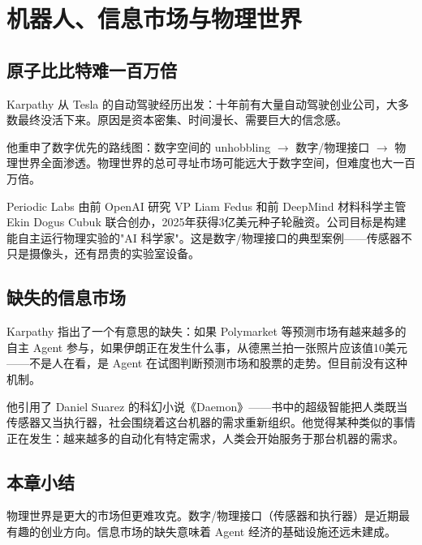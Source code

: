 \section{机器人、信息市场与物理世界}

\subsection{原子比比特难一百万倍}

Karpathy 从 Tesla 的自动驾驶经历出发：十年前有大量自动驾驶创业公司，大多数最终没活下来。原因是资本密集、时间漫长、需要巨大的信念感。

他重申了数字优先的路线图：数字空间的 unhobbling $\rightarrow$ 数字/物理接口 $\rightarrow$ 物理世界全面渗透。物理世界的总可寻址市场可能远大于数字空间，但难度也大一百万倍。

\begin{knowledgebox}{Periodic Labs}
由前 OpenAI 研究 VP Liam Fedus 和前 DeepMind 材料科学主管 Ekin Dogus Cubuk 联合创办，2025年获得3亿美元种子轮融资。公司目标是构建能自主运行物理实验的"AI 科学家"。这是数字/物理接口的典型案例——传感器不只是摄像头，还有昂贵的实验室设备。
\end{knowledgebox}

\subsection{缺失的信息市场}

Karpathy 指出了一个有意思的缺失：如果 Polymarket 等预测市场有越来越多的自主 Agent 参与，如果伊朗正在发生什么事，从德黑兰拍一张照片应该值10美元——不是人在看，是 Agent 在试图判断预测市场和股票的走势。但目前没有这种机制。

他引用了 Daniel Suarez 的科幻小说《Daemon》——书中的超级智能把人类既当传感器又当执行器，社会围绕着这台机器的需求重新组织。他觉得某种类似的事情正在发生：越来越多的自动化有特定需求，人类会开始服务于那台机器的需求。

\subsection{本章小结}

物理世界是更大的市场但更难攻克。数字/物理接口（传感器和执行器）是近期最有趣的创业方向。信息市场的缺失意味着 Agent 经济的基础设施还远未建成。



